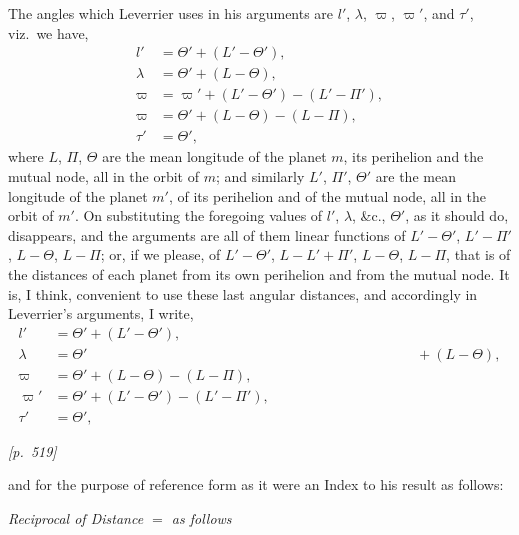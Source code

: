\documentclass[11pt]{article}
\begin{document}
The angles which Leverrier uses in his arguments are $l'$, $\lambda$,
$\varpi$, $\varpi'$, and $\tau'$, viz.\ we have,
\[
\begin{aligned}
l'&=\Theta'+(L'-\Theta'),\\
\lambda&=\Theta'+(L-\Theta),\\
\varpi&=\varpi'+(L'-\Theta')-(L'-\Pi'),\\
\varpi&=\Theta'+(L-\Theta)-(L-\Pi),\\
\tau'&=\Theta',
\end{aligned}
\]
where $L$, $\Pi$, $\Theta$ are the mean longitude of the planet $m$, its
perihelion and the mutual node, all in the orbit of $m$; and similarly
$L'$, $\Pi'$, $\Theta'$ are the mean longitude of the planet $m'$, of its
perihelion and of the mutual node, all in the orbit of $m'$. On
substituting the foregoing values of $l'$, $\lambda$, \&c., $\Theta'$, as
it should do, disappears, and the arguments are all of them linear
functions of $L'-\Theta'$, $L'-\Pi'$, $L-\Theta$, $L-\Pi$; or, if we
please, of $L'-\Theta'$, $L-L'+\Pi'$, $L-\Theta$, $L-\Pi$, that is of the
distances of each planet from its own perihelion and from the mutual
node. It is, I think, convenient to use these last angular distances, and
accordingly in Leverrier's arguments, I write,
\[
\begin{aligned}
l'&=\Theta'+(L'-\Theta'),\\
\lambda&=\Theta'\phantom{+(L-\Theta)+(L-\Pi)+(L'-\Theta')+(L'-\Pi')}+(L-\Theta),\\
\varpi&=\Theta'+(L-\Theta)-(L-\Pi),\\
\varpi'&=\Theta'+(L'-\Theta')-(L'-\Pi'),\\
\tau'&=\Theta',
\end{aligned}
\]


\bigskip
\noindent\textit{[p.~519]}

\medskip

and for the purpose of reference form as it were an Index to his result
as follows:

\medskip

\begin{center}
\textit{Reciprocal of Distance $=$ as follows}
\end{center}

\medskip
\end{document}
